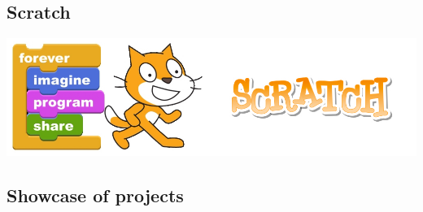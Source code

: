 \documentclass{beamer}
\begin{document}
\subsection{Scratch}
\begin{frame}
\vspace{1cm}
 \includegraphics[width=\textwidth]{imagery/scratch-logo}

\end{frame}








\subsection{Showcase of projects}
\end{document}
